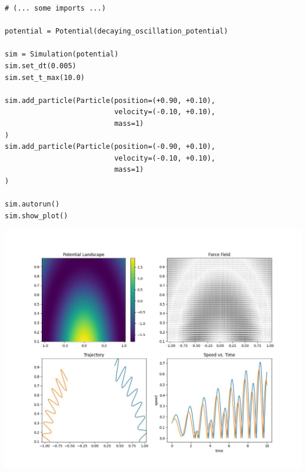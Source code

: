
\begin{frame}[fragile]
%
\begin{codebox}[main.py]
\begin{verbatim}
# (... some imports ...)

potential = Potential(decaying_oscillation_potential)

sim = Simulation(potential)
sim.set_dt(0.005)
sim.set_t_max(10.0)

sim.add_particle(Particle(position=(+0.90, +0.10),
                          velocity=(-0.10, +0.10),
                          mass=1)
)
sim.add_particle(Particle(position=(-0.90, +0.10),
                          velocity=(-0.10, +0.10),
                          mass=1)
)

sim.autorun()
sim.show_plot()
\end{verbatim}
\end{codebox}
%
\end{frame}


\begin{frame}
%
\vspace{-4pt}
\begin{center}
\includegraphics[width=.78\linewidth]{./gfx/01-result}
\end{center}
%
\end{frame}


